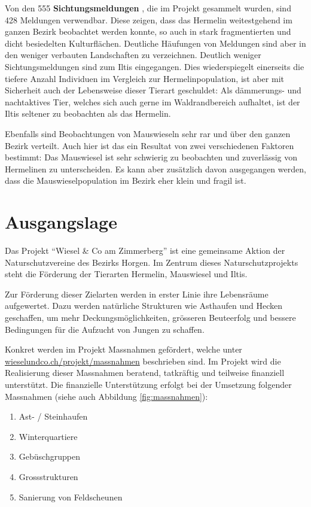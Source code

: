 \documentclass[
  oneside]{scrbook}
\providecommand{\tightlist}{%
  \setlength{\itemsep}{0pt}\setlength{\parskip}{0pt}}
\begin{document}
Von den 555 \textbf{Sichtungsmeldungen} , die im Projekt gesammelt wurden, sind 428 Meldungen verwendbar. Diese zeigen, dass das Hermelin weitestgehend im ganzen Bezirk beobachtet werden konnte, so auch in stark fragmentierten und dicht besiedelten Kulturflächen. Deutliche Häufungen von Meldungen sind aber in den weniger verbauten Landschaften zu verzeichnen. Deutlich weniger Sichtungsmeldungen sind zum Iltis eingegangen. Dies wiederspiegelt einerseits die tiefere Anzahl Individuen im Vergleich zur Hermelinpopulation, ist aber mit Sicherheit auch der Lebensweise dieser Tierart geschuldet: Als dämmerungs- und nachtaktives Tier, welches sich auch gerne im Waldrandbereich aufhaltet, ist der Iltis seltener zu beobachten als das Hermelin.

Ebenfalls sind Beobachtungen von Mauswieseln sehr rar und über den ganzen Bezirk verteilt. Auch hier ist das ein Resultat von zwei verschiedenen Faktoren bestimmt: Das Mauswiesel ist sehr schwierig zu beobachten und zuverlässig von Hermelinen zu unterscheiden. Es kann aber zusätzlich davon ausgegangen werden, dass die Mauswieselpopulation im Bezirk eher klein und fragil ist.

\hypertarget{ausgangslage}{%
\chapter{Ausgangslage}\label{ausgangslage}}

Das Projekt ``Wiesel \& Co am Zimmerberg'' ist eine gemeinsame Aktion der Naturschutzvereine des Bezirks Horgen. Im Zentrum dieses Naturschutzprojekts steht die Förderung der Tierarten Hermelin, Mauswiesel und Iltis.

Zur Förderung dieser Zielarten werden in erster Linie ihre Lebensräume aufgewertet. Dazu werden natürliche Strukturen wie Asthaufen und Hecken geschaffen, um mehr Deckungsmöglichkeiten, grösseren Beuteerfolg und bessere Bedingungen für die Aufzucht von Jungen zu schaffen.

Konkret werden im Projekt Massnahmen gefördert, welche unter \href{http://wieselundco.ch/projekt/massnahmen}{wieselundco.ch/projekt/massnahmen} beschrieben sind. Im Projekt wird die Realisierung dieser Massnahmen beratend, tatkräftig und teilweise finanziell unterstützt. Die finanzielle Unterstützung erfolgt bei der Umsetzung folgender Massnahmen (siehe auch Abbildung \ref{fig:massnahmen}):

\begin{enumerate}
\def\labelenumi{\arabic{enumi}.}
\tightlist
\item
  Ast- / Steinhaufen
\item
  Winterquartiere
\item
  Gebüschgruppen
\item
  Grossstrukturen
\item
  Sanierung von Feldscheunen
\end{enumerate}
\end{document}
